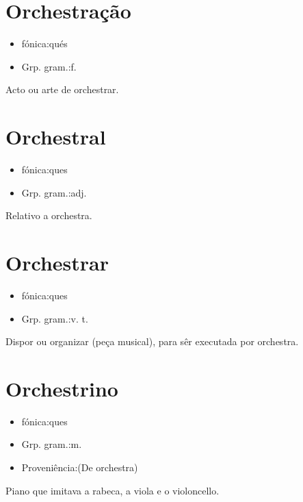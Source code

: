 \section{Orchestração}
\begin{itemize}
\item {fónica:qués}
\end{itemize}
\begin{itemize}
\item {Grp. gram.:f.}
\end{itemize}
Acto ou arte de orchestrar.
\section{Orchestral}
\begin{itemize}
\item {fónica:ques}
\end{itemize}
\begin{itemize}
\item {Grp. gram.:adj.}
\end{itemize}
Relativo a orchestra.
\section{Orchestrar}
\begin{itemize}
\item {fónica:ques}
\end{itemize}
\begin{itemize}
\item {Grp. gram.:v. t.}
\end{itemize}
Dispor ou organizar (peça musical), para sêr executada por orchestra.
\section{Orchestrino}
\begin{itemize}
\item {fónica:ques}
\end{itemize}
\begin{itemize}
\item {Grp. gram.:m.}
\end{itemize}
\begin{itemize}
\item {Proveniência:(De \textunderscore orchestra\textunderscore )}
\end{itemize}
Piano que imitava a rabeca, a viola e o violoncello.
